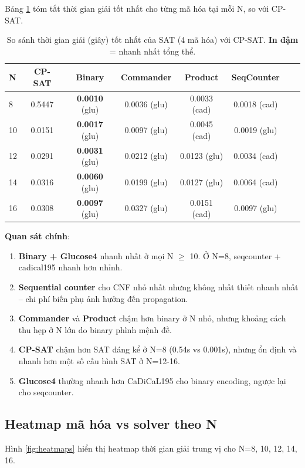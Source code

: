 \documentclass[a4paper,fleqn]{cas-sc}
\begin{document}
\begin{itemize}
{Bảng \ref{tab:comparison} tóm tắt thời gian giải tốt nhất cho từng mã hóa tại mỗi N, so với CP-SAT.

\begin{table}[htbp]
\centering
\caption{So sánh thời gian giải (giây) tốt nhất của SAT (4 mã hóa) với CP-SAT. \textbf{In đậm} = nhanh nhất tổng thể.}
\label{tab:comparison}
\begin{tabular}{lccccccc}
\toprule
N & CP-SAT & Binary & Commander & Product & SeqCounter \\
\midrule
8  & 0.5447 & \textbf{0.0010} (glu) & 0.0036 (glu) & 0.0033 (cad) & 0.0018 (cad) \\
10 & 0.0151 & \textbf{0.0017} (glu) & 0.0097 (glu) & 0.0045 (cad) & 0.0019 (glu) \\
12 & 0.0291 & \textbf{0.0031} (glu) & 0.0212 (glu) & 0.0123 (glu) & 0.0034 (cad) \\
14 & 0.0316 & \textbf{0.0060} (glu) & 0.0199 (glu) & 0.0127 (glu) & 0.0064 (cad) \\
16 & 0.0308 & \textbf{0.0097} (glu) & 0.0327 (glu) & 0.0151 (cad) & 0.0097 (glu) \\
\bottomrule
\end{tabular}
\end{table}

\textbf{Quan sát chính}:
\begin{enumerate}
    \item \textbf{Binary + Glucose4} nhanh nhất ở mọi N $\ge$ 10. Ở N=8, seqcounter + cadical195 nhanh hơn nhỉnh.
    \item \textbf{Sequential counter} cho CNF nhỏ nhất nhưng không nhất thiết nhanh nhất -- chi phí biến phụ ảnh hưởng đến propagation.
    \item \textbf{Commander} và \textbf{Product} chậm hơn binary ở N nhỏ, nhưng khoảng cách thu hẹp ở N lớn do binary phình mệnh đề.
    \item \textbf{CP-SAT} chậm hơn SAT đáng kể ở N=8 (0.54s vs 0.001s), nhưng ổn định và nhanh hơn một số cấu hình SAT ở N=12-16.
    \item \textbf{Glucose4} thường nhanh hơn CaDiCaL195 cho binary encoding, ngược lại cho seqcounter.
\end{enumerate}

\subsection{Heatmap mã hóa vs solver theo N}
\label{sec:heatmap}

Hình \ref{fig:heatmaps} hiển thị heatmap thời gian giải trung vị cho N=8, 10, 12, 14, 16.

}
\end{itemize}
\end{document}
